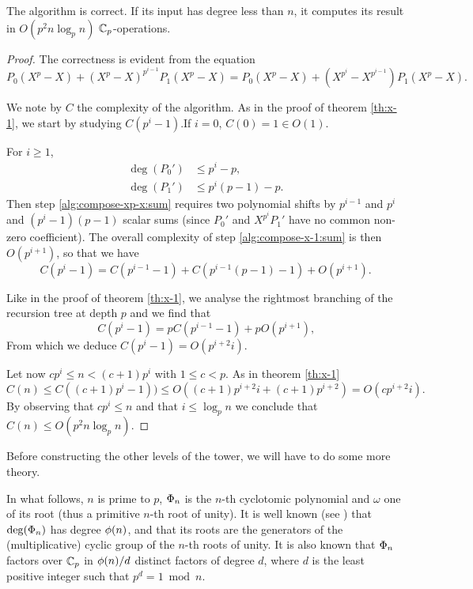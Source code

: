 \begin{theorem}
  The algorithm  is correct. If its input has
  degree less than $n$, it computes its result in $O(p^2n\log_pn)$
  $\mathbb{C}_p$-operations.
\end{theorem}
\begin{proof}
  The correctness is evident from the equation
  \begin{equation*}
    P_0(X^p-X) + (X^p-X)^{p^{i-1}}P_1(X^p-X) =
    P_0(X^p-X) + (X^{p^i}-X^{p^{i-1}})P_1(X^p-X)\text{.}
  \end{equation*}

  We note by $C$ the complexity of the algorithm. As in the proof of
  theorem \ref{th:x-1}, we start by studying $C(p^i-1)$.If $i=0$,
  $C(0) = 1\in O(1)$.

  For $i\ge1$,
  \begin{align*}
    \deg(P_0')&\le p^i-p\text{,}\\
    \deg(P_1')&\le p^i(p-1)-p\text{.}
  \end{align*}
  Then step \ref{alg:compose-xp-x:sum} requires two polynomial shifts
  by $p^{i-1}$ and $p^i$ and $(p^i-1)(p-1)$ scalar sums (since $P_0'$
  and $X^{p^i}P_1'$ have no common non-zero coefficient). The overall
  complexity of step \ref{alg:compose-x-1:sum} is then $O(p^{i+1})$,
  so that we have
  \[C(p^i-1) = C(p^{i-1}-1) + C(p^{i-1}(p-1)-1) + O(p^{i+1})\text{.}\]

  Like in the proof of theorem \ref{th:x-1}, we analyse the rightmost
  branching of the recursion tree at depth $p$ and we find that
  \[C(p^i-1) = pC(p^{i-1}-1) + pO(p^{i+1})\text{,}\]
  From which we deduce $C(p^i-1) = O(p^{i+2}i)$.

  Let now $cp^i\le n<(c+1)p^i$ with $1\le c<p$. As in theorem
  \ref{th:x-1}
  \begin{equation*}
    C(n) \le C((c+1)p^i-1)) \le O\left((c+1)p^{i+2}i + (c+1)p^{i+2}\right) = 
    O\left(cp^{i+2}i\right)
    \text{.}
  \end{equation*}
  By observing that $cp^i\le n$ and that $i\le\log_pn$ we conclude
  that $C(n) \le O(p^2n\log_pn)$.
\end{proof}

Before constructing the other levels of the tower, we will have to do
some more theory.

In what follows, $n$ is prime to $p$, $\Phi_n$ is the $n$-th
cyclotomic polynomial and $\omega$ one of its root (thus a primitive
$n$-th root of unity). It is well known (see \cite[Section 2.4]{LN})
that $\deg(\Phi_n)$ has degree $\phi(n)$, and that its roots are
the generators of the (multiplicative) cyclic group of the $n$-th
roots of unity. It is also known that $\Phi_n$ factors over $\mathbb{C}_p$
in $\phi(n)/d$ distinct factors of degree $d$, where $d$ is the
least positive integer such that $p^d=1\bmod n$.

